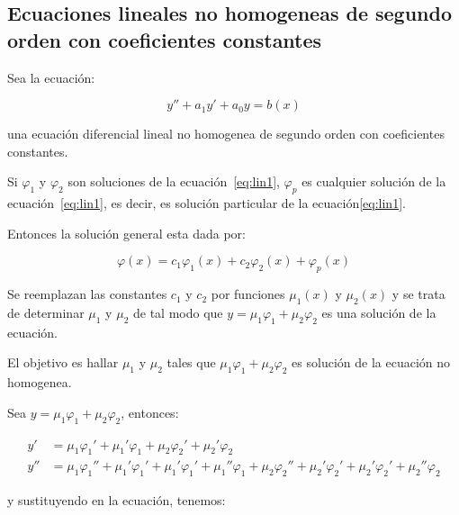 	\newpage
	\subsection{Ecuaciones lineales no homogeneas de segundo orden con coeficientes constantes}

		\begin{definicion}
			Sea la ecuación:

			\begin{equation} \label{eq:lin1}
				y'' + a_1 y' + a_0 y = b(x)
			\end{equation}

			una ecuación diferencial lineal no homogenea de segundo orden con coeficientes constantes.
		\end{definicion}

		\begin{teorema}
			Si $\varphi_1$ y $\varphi_2$ son soluciones de la ecuación~\ref{eq:lin1}, $\varphi_p$ es cualquier solución de la ecuación~\ref{eq:lin1}, es decir, es solución particular de la ecuación\ref{eq:lin1}.

			Entonces la solución general esta dada por:

			\begin{equation}
				\varphi(x) = c_1 \varphi_1(x) + c_2 \varphi_2(x) + \varphi_p(x)
			\end{equation}
		\end{teorema}

		Se reemplazan las constantes $c_1$ y $c_2$ por funciones $\mu_1(x)$ y $\mu_2(x)$ y se trata de determinar $\mu_1$ y $\mu_2$ de tal modo que $y = \mu_1 \varphi_1 + \mu_2 \varphi_2$ es una solución de la ecuación.

		El objetivo es hallar $\mu_1$ y $\mu_2$ tales que $\mu_1 \varphi_1 + \mu_2 \varphi_2$ es solución de la ecuación no homogenea.

		Sea $y = \mu_1 \varphi_1 + \mu_2 \varphi_2$, entonces:

		\begin{align*}
			y' &= \mu_1 \varphi_1' + \mu_1' \varphi_1 + \mu_2 \varphi_2' + \mu_2' \varphi_2 \\
			y'' &= \mu_1 \varphi_1'' + \mu_1' \varphi_1' + \mu_1' \varphi_1' + \mu_1'' \varphi_1 + \mu_2 \varphi_2'' + \mu_2' \varphi_2' + \mu_2' \varphi_2' + \mu_2'' \varphi_2
		\end{align*}

		y sustituyendo en la ecuación, tenemos:

